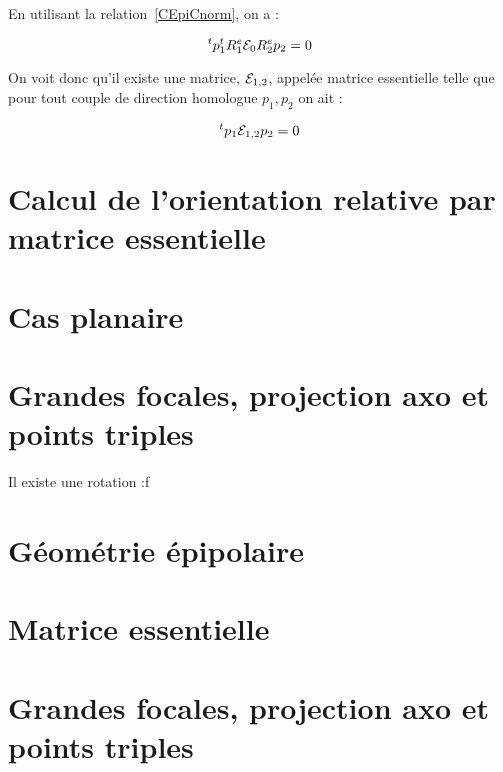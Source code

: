 En utilisant la relation~\ref{CEpiCnorm}, on a :

\begin{equation}
    ^t p_1 ^t R^e_1  \Ess_0 R^e_2 p_2 = 0
\end{equation}

On voit donc qu'il existe une  matrice,  $\Ess_{1,2}$,  appel\'ee
matrice essentielle telle que  pour tout couple de direction homologue
$p_1,p_2$ on ait :

\begin{equation}
    ^t p_1  \Ess_{1,2}  p_2 = 0
 \end{equation}



\section{Calcul de l'orientation relative par matrice essentielle}



\section{Cas planaire}


\section{Grandes focales, projection axo et points triples}


Il existe une rotation :f

\section{G\'eom\'etrie \'epipolaire}

\section{Matrice essentielle}



\section{Grandes focales, projection axo et points triples}

